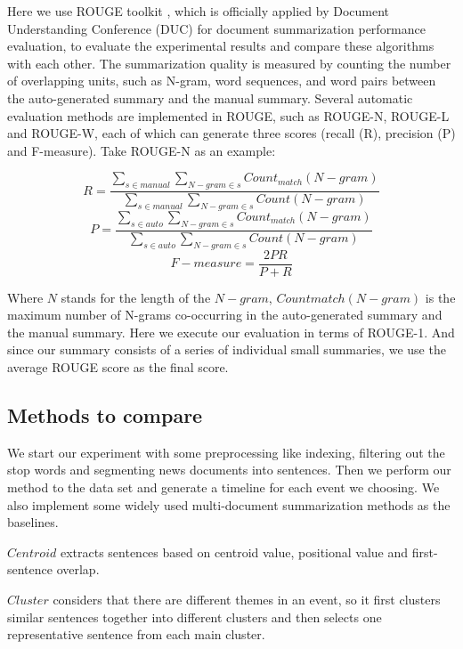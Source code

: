 \documentclass{llncs}
\begin{document}
Here we use ROUGE toolkit \cite{2004-Lin-p74-81} , which is officially applied by Document Understanding Conference (DUC) for document summarization performance evaluation, to evaluate the experimental results and compare these algorithms with each other. The summarization quality is measured by counting the number of overlapping units, such as N-gram, word sequences, and word pairs between the auto-generated summary and the manual summary. Several automatic evaluation methods are implemented in ROUGE, such as ROUGE-N, ROUGE-L and ROUGE-W, each of which can generate three scores (recall (R), precision (P) and F-measure). Take ROUGE-N as an example:

\begin{equation}
R=\frac{\sum_{s \in manual } \sum_{N-gram \in s} Count_{match}(N-gram) } { \sum_{s \in manual} \sum_{N-gram \in s} Count(N-gram)  } \end{equation}
\begin{equation}
P=\frac{\sum_{s \in auto } \sum_{N-gram \in s} Count_{match}(N-gram) } { \sum_{s \in auto} \sum_{N-gram \in s} Count(N-gram)  }
\end{equation}
\begin{equation}
F-measure = \frac{2PR}{P+R}
\end{equation}

Where $N$ stands for the length of the $N-gram$, $Countmatch(N-gram)$ is the maximum number of N-grams co-occurring in the auto-generated summary and the manual summary. Here we execute our evaluation in terms of ROUGE-1. And since our summary consists of a series of individual small summaries, we use the average ROUGE score as the final score.

\subsection{Methods to compare}

We start our experiment with some preprocessing like indexing, filtering out the stop words and segmenting news documents into sentences. Then we perform our method to the data set and generate a timeline for each event we choosing. We also implement some widely used multi-document summarization methods as the baselines.

$Centroid$ extracts sentences based on centroid value, positional value and first-sentence overlap.

$Cluster$ considers that there are different themes in an event, so it first clusters similar sentences together into different clusters and then selects one representative sentence from each main cluster.
\end{document}
